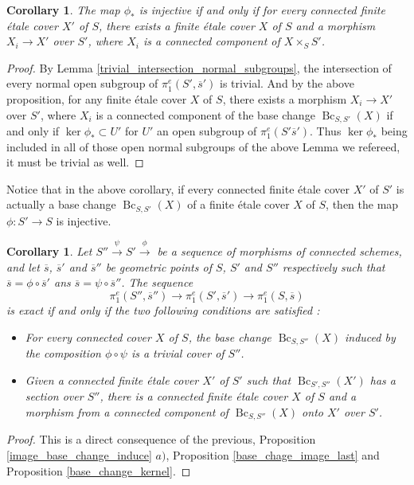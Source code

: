 \documentclass{article}
\theoremstyle{plain}
\newtheorem{corollary}[theorem]{Corollary}
\theoremstyle{definition}
\DeclareMathOperator{\Bc}{Bc}
\begin{document}
\begin{corollary}
\label{criteria_injective_morphism_fund_group}
    The map $\phi_*$ is injective if and only if for every connected finite \'etale cover $X'$ of $S$, there exists a finite \'etale cover $X$ of $S$ and a morphism $X_i\rightarrow X'$ over $S'$, where $X_i$ is a connected component of $X\times_SS'$.
\end{corollary}
\begin{proof}
    By Lemma \ref{trivial_intersection_normal_subgroups}, the intersection of every normal open subgroup of $\pi^e_1(S',\overline{s}')$ is trivial.
    And by the above proposition, for any finite \'etale cover $X$ of $S$, there exists a morphism $X_i\rightarrow X'$ over $S'$, where $X_i$ is a connected component of the base change $\Bc_{S,S'}(X)$ if and only if $\ker \phi_* \subset U'$ for $U'$ an open subgroup of $\pi^e_1(S'\overline{s}')$.
    Thus $\ker\phi_*$ being included in all of those open normal subgroups of the above Lemma we refereed, it must be trivial as well.
\end{proof}

\noindent Notice that in the above corollary, if every connected finite \'etale cover $X'$ of $S'$ is actually a base change $\Bc_{S,S'}(X)$ of a finite \'etale cover $X$ of $S$, then the map $\phi: S'\rightarrow S$ is injective.

\begin{corollary}
\label{exact_sequence_middle}
    Let $S''\xrightarrow{\psi} S'\xrightarrow{\phi}$ be a sequence of morphisms of connected schemes, and let $\overline{s}$, $\overline{s}'$ and $\overline{s}''$ be geometric points of $S$, $S'$ and $S''$ respectively such that $\overline{s}= \phi\circ\overline{s}'$ ans $\overline{s}=\psi\circ \overline{s}''$. The sequence 
    $$\pi^e_1(S'',\overline{s}'')\rightarrow \pi^e_1(S',\overline{s}')\rightarrow \pi^e_1(S,\overline{s})$$
    is exact if and only if the two following  conditions are satisfied :
    \begin{itemize}
        \item[$a)$] For every connected cover $X$ of $S$, the base change $\Bc_{S,S''}(X)$ induced by the composition $\phi\circ\psi$ is a trivial cover of $S''$.
        \item[$b)$] Given a connected finite \'etale cover $X'$ of $S'$ such that $\Bc_{S',S''}(X')$ has a section over $S''$, there is a connected finite \'etale cover $X$ of $S$ and a morphism from a connected component of $\Bc_{S,S''}(X)$ onto $X'$ over $S'$.
    \end{itemize}
\end{corollary}
\begin{proof}
    This is a direct consequence of the previous, Proposition \ref{image_base_change_induce} $a)$, Proposition \ref{base_chage_image_last} and Proposition \ref{base_change_kernel}.
\end{proof}
\end{document}
